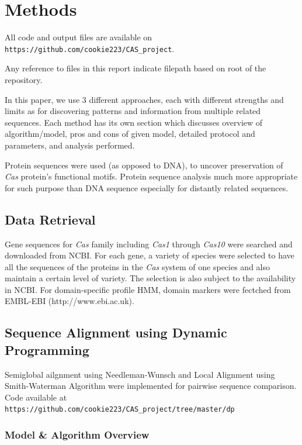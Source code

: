 \documentclass[11pt, oneside]{article}
\begin{document}
\section{Methods}

All code and output files are available on \texttt{https://github.com/cookie223/CAS\_project}. 

Any reference to files in this report indicate filepath based on root of the repository. 

In this paper, we use 3 different approaches, each with different strengths and limits as for discovering patterns and information from multiple related sequences. Each method has its own section which discusses overview of algorithm/model, pros and cons of given model, detailed protocol and parameters, and analysis performed. 

Protein sequences were used (as opposed to DNA), to uncover preservation of \textit{Cas} protein's functional motifs. Protein sequence analysis much more appropriate for such purpose than DNA sequence especially for distantly related sequences. 

\subsection{Data Retrieval}

Gene sequences for \textit{Cas} family including \textit{Cas1} through \textit{Cas10} were searched and downloaded from NCBI. For each gene, a variety of species were selected to have all the sequences of the proteins in the \textit{Cas} system of one species and also maintain a certain level of variety. The selection is also subject to the availability in NCBI. For domain-specific profile HMM, domain markers were fectched from EMBL-EBI (http://www.ebi.ac.uk). 

\subsection{Sequence Alignment using Dynamic Programming} \label{dpProtocol}

Semiglobal ailgnment using Needleman-Wunsch\cite{needlemanwunsch} and Local Alignment using Smith-Waterman Algorithm\cite{smithwaterman} were implemented for pairwise sequence comparison.
Code available at \texttt{https://github.com/cookie223/CAS\_project/tree/master/dp}


\subsubsection{Model \& Algorithm Overview}
\end{document}
